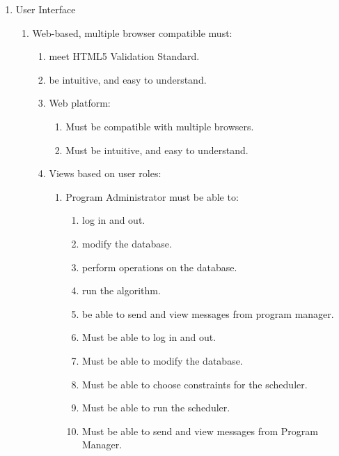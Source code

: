 \documentclass[12pt]{article}
\begin{document}
\begin{enumerate}
\item User Interface
	\begin{enumerate}
	\item Web-based, multiple browser compatible must:
		\begin{enumerate}
		\item meet HTML5 Validation Standard.
		\item be intuitive, and easy to understand.
	\item Web platform:
		\begin{enumerate}
		\item Must be compatible with multiple browsers.
		\item Must be intuitive, and easy to understand.
		\end{enumerate}
	\item Views based on user roles:
		\begin{enumerate}
		\item Program Administrator must be able to:
			\begin{enumerate}

		    \item log in and out.
		    \item modify the database.
		    \item perform operations on the database.
		    \item run the algorithm.
		    \item be able to send and view messages from program manager.

		    \item Must be able to log in and out.
		    \item Must be able to modify the database.
		    \item Must be able to choose constraints for the scheduler.
		    \item Must be able to run the scheduler.
		    \item Must be able to send and view messages from Program Manager.


\end{enumerate}
\end{enumerate}
\end{enumerate}
\end{enumerate}
\end{enumerate}
\end{document}
